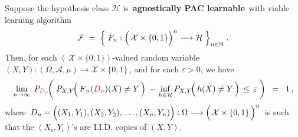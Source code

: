 \vskip 1.0cm
\begin{remark}
\mbox{}\vskip 0.1cm
\noindent
Suppose the hypothesis class $\mathcal{H}$ is \,\textbf{agnostically PAC learnable}\,
with viable learning algorithm
\begin{equation*}
\mathcal{F} \; = \; \left\{\;
	F_{n} : \left(\,\mathcal{X}\overset{{\color{white}.}}{\times}\{0,1\}\right)^{n} \longrightarrow\mathcal{H}
	\;\right\}_{n\in\N}\,.
\end{equation*}
Then,
for each $\left(\,\mathcal{X}\times\{0,1\}\right)$-valued random variable
$(X,Y) : (\Omega,\mathcal{A},\mu) \longrightarrow \mathcal{X}\times\{0,1\}$\,,
and for each $\varepsilon > 0$, we have
\begin{equation*}
\underset{n\rightarrow\infty}{\lim}\;\,P_{{\color{red}D_{n}}}\!\!\left(\;
	P_{X,Y}\!\!\left(\,\overset{{\color{white}.}}{F}_{n}({\color{red}D_{n}})(X) \neq Y \,\right)
		\,-\,
		\underset{h\in\mathcal{H}}{\inf}\,P_{X,Y}\!\!\left(\,\overset{{\color{white}.}}{h}(X) \neq Y \,\right)
	\,\leq\,
		\varepsilon
	\;\right)
\;\; = \;\;
	1\,,
\end{equation*}
where
\,$D_{n} = \left((X_{1},Y_{1}),(X_{2},Y_{2}),\,\overset{{\color{white}\vert}}{\ldots}\,,(X_{n},Y_{n})\right)
	: \Omega \longrightarrow
	\left(\,\mathcal{X}\overset{{\color{white}.}}{\times}\{0,1\}\,\right)^{n}$\,
is such that the
$(X_{i},Y_{i})$'s are I.I.D. copies of $(X,Y)$.
\end{remark}


